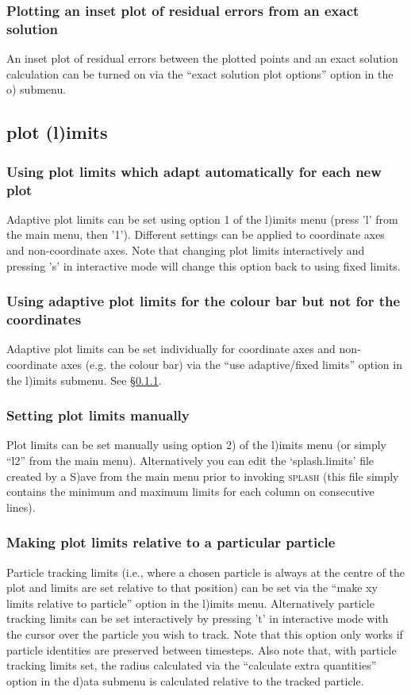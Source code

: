\documentclass[a4paper,10pt]{article}
\newcommand{\splash}{\textsc{splash }}
\begin{document}
\subsubsection{ Plotting an inset plot of residual errors from an exact solution}
 An inset plot of residual errors between the plotted points and an exact solution calculation can be turned on via the ``exact solution plot options'' option in the o) submenu.

\subsection{plot (l)imits}%

\subsubsection{ Using plot limits which adapt automatically for each new plot}
\label{sec:adapt}
 Adaptive plot limits can be set using option 1 of the l)imits menu (press 'l' from the main menu, then '1'). Different settings can be applied to coordinate axes and non-coordinate axes. Note that changing plot limits interactively and pressing 's' in interactive mode will change this option back to using fixed limits.

\subsubsection{ Using adaptive plot limits for the colour bar but not for the coordinates}
 Adaptive plot limits can be set individually for coordinate axes and non-coordinate axes (e.g. the colour bar) via the ``use adaptive/fixed limits'' option in the l)imits submenu. See \S\ref{sec:adapt}. 

\subsubsection{ Setting plot limits manually}
 Plot limits can be set manually using option 2) of the l)imits menu (or simply ``l2'' from the main menu). Alternatively you can edit the `splash.limits' file created by a S)ave from the main menu prior to invoking \splash (this file simply contains the minimum and maximum limits for each column on consecutive lines).

\subsubsection{ Making plot limits relative to a particular particle}
\label{sec:track}
 Particle tracking limits (i.e., where a chosen particle is always at the centre of the plot and limits are set relative to that position) can be set via the ``make xy limits relative to particle'' option in the l)imits menu. Alternatively particle tracking limits can be set interactively by pressing 't' in interactive mode with the cursor over the particle you wish to track. Note that this option only works if particle identities are preserved between timesteps. Also note that, with particle tracking limits set, the radius calculated via the ``calculate extra quantities'' option in the d)ata submenu is calculated relative to the tracked particle.
\end{document}
